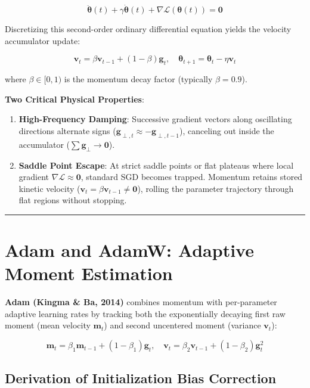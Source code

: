 \documentclass[
  letterpaper,
]{scrbook}
\providecommand{\tightlist}{%
  \setlength{\itemsep}{0pt}\setlength{\parskip}{0pt}}
\begin{document}
\[\ddot{\mathbf{\theta}}(t) + \gamma \dot{\mathbf{\theta}}(t) + \nabla \mathcal{L}(\mathbf{\theta}(t)) = \mathbf{0}\]

Discretizing this second-order ordinary differential equation yields the
velocity accumulator update:

\[\mathbf{v}_t = \beta \mathbf{v}_{t-1} + (1 - \beta) \mathbf{g}_t, \quad \mathbf{\theta}_{t+1} = \mathbf{\theta}_t - \eta \mathbf{v}_t\]

where \(\beta \in [0, 1)\) is the momentum decay factor (typically
\(\beta = 0.9\)).

\textbf{Two Critical Physical Properties}:

\begin{enumerate}
\def\labelenumi{\arabic{enumi}.}
\tightlist
\item
  \textbf{High-Frequency Damping}: Successive gradient vectors along
  oscillating directions alternate signs
  (\(\mathbf{g}_{\perp, t} \approx -\mathbf{g}_{\perp, t-1}\)),
  canceling out inside the accumulator
  (\(\sum \mathbf{g}_\perp \to \mathbf{0}\)).
\item
  \textbf{Saddle Point Escape}: At strict saddle points or flat plateaus
  where local gradient \(\nabla \mathcal{L} \approx \mathbf{0}\),
  standard SGD becomes trapped. Momentum retains stored kinetic velocity
  (\(\mathbf{v}_t = \beta \mathbf{v}_{t-1} \ne \mathbf{0}\)), rolling
  the parameter trajectory through flat regions without stopping.
\end{enumerate}

\begin{center}\rule{0.5\linewidth}{0.5pt}\end{center}

\section{Adam and AdamW: Adaptive Moment
Estimation}\label{adam-and-adamw-adaptive-moment-estimation}

\textbf{Adam (Kingma \& Ba, 2014)} combines momentum with per-parameter
adaptive learning rates by tracking both the exponentially decaying
first raw moment (mean velocity \(\mathbf{m}_t\)) and second uncentered
moment (variance \(\mathbf{v}_t\)):

\[\mathbf{m}_t = \beta_1 \mathbf{m}_{t-1} + (1 - \beta_1) \mathbf{g}_t, \quad \mathbf{v}_t = \beta_2 \mathbf{v}_{t-1} + (1 - \beta_2) \mathbf{g}_t^2\]

\subsection{Derivation of Initialization Bias
Correction}\label{derivation-of-initialization-bias-correction}
\end{document}
